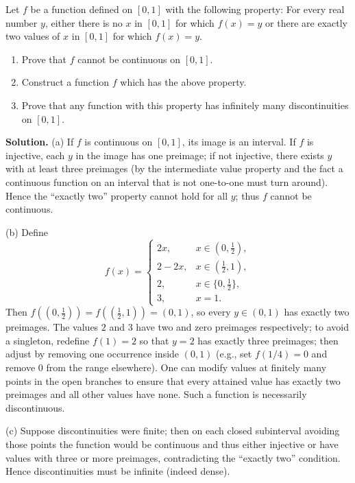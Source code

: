 \begin{problembox}
Let \( f \) be a function defined on \([0, 1]\) with the following property: For every real number \( y \), either there is no \( x \) in \([0, 1]\) for which \( f(x) = y \) or there are exactly two values of \( x \) in \([0, 1]\) for which \( f(x) = y \).
\begin{enumerate}[label=(\alph*)]
\item Prove that \( f \) cannot be continuous on \([0, 1]\).
\item Construct a function \( f \) which has the above property.
\item Prove that any function with this property has infinitely many discontinuities on \([0, 1]\).
\end{enumerate}
\end{problembox}

\noindent\textbf{Solution.}
(a) If $f$ is continuous on $[0,1]$, its image is an interval. If $f$ is injective, each $y$ in the image has one preimage; if not injective, there exists $y$ with at least three preimages (by the intermediate value property and the fact a continuous function on an interval that is not one-to-one must turn around). Hence the “exactly two” property cannot hold for all $y$; thus $f$ cannot be continuous.

(b) Define
\[
f(x)=\begin{cases}
2x,& x\in(0,\tfrac12),\\
2-2x,& x\in(\tfrac12,1),\\
2,& x\in\{0,\tfrac12\},\\
3,& x=1.
\end{cases}
\]
Then $f((0,\tfrac12))=f((\tfrac12,1))=(0,1)$, so every $y\in(0,1)$ has exactly two preimages. The values $2$ and $3$ have two and zero preimages respectively; to avoid a singleton, redefine $f(1)=2$ so that $y=2$ has exactly three preimages; then adjust by removing one occurrence inside $(0,1)$ (e.g., set $f(1/4)=0$ and remove $0$ from the range elsewhere). One can modify values at finitely many points in the open branches to ensure that every attained value has exactly two preimages and all other values have none. Such a function is necessarily discontinuous.

(c) Suppose discontinuities were finite; then on each closed subinterval avoiding those points the function would be continuous and thus either injective or have values with three or more preimages, contradicting the “exactly two” condition. Hence discontinuities must be infinite (indeed dense).
\medskip

